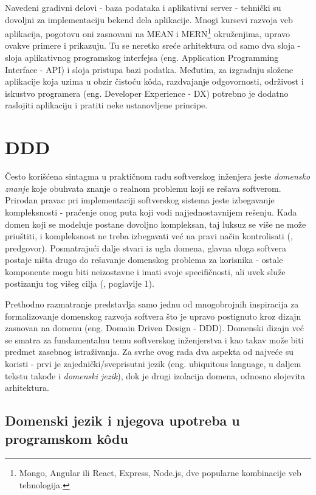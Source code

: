 \documentclass[12pt,oneside]{memoir}
\begin{document}
Navedeni gradivni delovi - baza podataka i aplikativni server - tehnički su dovoljni za implementaciju bekend dela aplikacije. Mnogi kursevi razvoja veb aplikacija, pogotovu oni zasnovani na MEAN i MERN\footnote{Mongo, Angular ili React, Express, Node.js, dve popularne kombinacije veb tehnologija.} okruženjima, upravo ovakve primere i prikazuju. Tu se neretko sreće arhitektura od samo dva sloja - sloja aplikativnog programskog interfejsa (eng. Application Programming Interface - API) i sloja pristupa bazi podatka. Međutim, za izgradnju složene aplikacije koja uzima u obzir čistoću k\^{o}da, razdvajanje odgovornosti, održivost i iskustvo programera (eng. Developer Experience - DX) potrebno je dodatno raslojiti aplikaciju i pratiti neke ustanovljene principe.


\section{DDD}
\label{sec:dddsection}

Često korišćena sintagma u praktičnom radu softverskog inženjera jeste \textit{domensko znanje} koje obuhvata znanje o realnom problemu koji se rešava softverom. Prirodan pravac pri implementaciji softverskog sistema jeste izbegavanje kompleksnosti - praćenje onog puta koji vodi najjednostavnijem rešenju. Kada domen koji se modeluje postane dovoljno kompleksan, taj luksuz se više ne može priuštiti, i kompleksnost ne treba izbegavati već na pravi način kontrolisati (\cite{dddfull}, predgovor). Posmatrajući dalje stvari iz ugla domena, glavna uloga softvera postaje ništa drugo do rešavanje domenskog problema za korisnika - ostale komponente mogu biti neizostavne i imati svoje specifičnosti, ali uvek služe postizanju tog višeg cilja (\cite{dddfull}, poglavlje 1).

Prethodno razmatranje predstavlja samo jednu od mnogobrojnih inspiracija za formalizovanje domenskog razvoja softvera što je upravo postignuto kroz dizajn zasnovan na domenu (eng. Domain Driven Design - DDD). Domenski dizajn već se smatra za fundamentalnu temu softverskog inženjerstva i kao takav može biti predmet zasebnog istraživanja. Za svrhe ovog rada dva aspekta od najveće su koristi - prvi je zajednički/sveprisutni jezik (eng. ubiquitous language, u daljem tekstu takođe i \textit{domenski jezik}), dok je drugi izolacija domena, odnosno slojevita arhitektura. 

\subsection{Domenski jezik i njegova upotreba u programskom k\^{o}du}
\label{sec:dddukodu}
\end{document}
